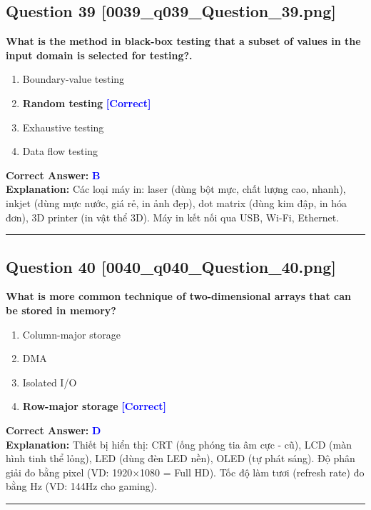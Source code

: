 \documentclass[11pt,a4paper]{article}
\begin{document}
\begin{minipage}{\textwidth}
\subsection*{Question 39 \quad \footnotesize{[0039\_q039\_Question\_39.png]}}
\noindent \textbf{What is the method in black-box testing that a subset of values in the input domain is selected for testing?.}

\begin{enumerate}[label=\Alph*.]
    \item Boundary-value testing
    \item \textbf{Random testing} \hfill \textcolor{blue}{\textbf{[Correct]}}
    \item Exhaustive testing
    \item Data flow testing
\end{enumerate}

\noindent \textbf{Correct Answer:} \textcolor{blue}{\textbf{B}} \\[2pt]
\noindent \textbf{Explanation:} Các loại máy in: laser (dùng bột mực, chất lượng cao, nhanh), inkjet (dùng mực nước, giá rẻ, in ảnh đẹp), dot matrix (dùng kim đập, in hóa đơn), 3D printer (in vật thể 3D). Máy in kết nối qua USB, Wi-Fi, Ethernet.

\par\vspace{0.3cm}
\hrule
\vspace{0.3cm}
\end{minipage}

\begin{minipage}{\textwidth}
\subsection*{Question 40 \quad \footnotesize{[0040\_q040\_Question\_40.png]}}
\noindent \textbf{What is more common technique of two-dimensional arrays that can be stored in memory?}

\begin{enumerate}[label=\Alph*.]
    \item Column-major storage
    \item DMA
    \item Isolated I/O
    \item \textbf{Row-major storage} \hfill \textcolor{blue}{\textbf{[Correct]}}
\end{enumerate}

\noindent \textbf{Correct Answer:} \textcolor{blue}{\textbf{D}} \\[2pt]
\noindent \textbf{Explanation:} Thiết bị hiển thị: CRT (ống phóng tia âm cực - cũ), LCD (màn hình tinh thể lỏng), LED (dùng đèn LED nền), OLED (tự phát sáng). Độ phân giải đo bằng pixel (VD: 1920×1080 = Full HD). Tốc độ làm tươi (refresh rate) đo bằng Hz (VD: 144Hz cho gaming).

\par\vspace{0.3cm}
\hrule
\vspace{0.3cm}
\end{minipage}
\end{document}
